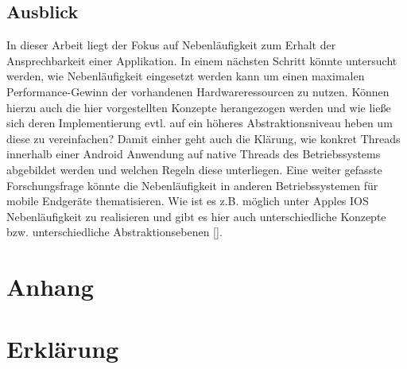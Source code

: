 \documentclass[12pt,oneside,a4paper,bibtotoc,liststotoc]{scrreprt}
\begin{document}
\section{Ausblick}
In dieser Arbeit liegt der Fokus auf Nebenläufigkeit zum Erhalt der Ansprechbarkeit einer Applikation. In einem nächsten Schritt könnte untersucht werden, wie Nebenläufigkeit eingesetzt werden kann um einen maximalen Performance-Gewinn der vorhandenen Hardwareressourcen zu nutzen. Können hierzu auch die hier vorgestellten Konzepte herangezogen werden und wie ließe sich deren Implementierung evtl. auf ein höheres Abstraktionsniveau heben um diese zu vereinfachen? Damit einher geht auch die Klärung, wie konkret Threads innerhalb einer Android Anwendung auf native Threads des Betriebssystems abgebildet werden und welchen Regeln diese unterliegen. Eine weiter gefasste Forschungsfrage könnte die Nebenläufigkeit in anderen Betriebssystemen für mobile Endgeräte thematisieren. Wie ist es z.B. möglich unter Apples IOS Nebenläufigkeit zu realisieren und gibt es hier auch unterschiedliche Konzepte bzw. unterschiedliche Abstraktionsebenen [\citet{javaConInPrac}].

\nocite{javaConInPrac, nebenlaeufigeProg, handlerLooperBlock, android5, philosofen, handlerLooperBlock, androidDevDocu, declarativProgrammingScript, declarativCriticalJurnal, funcProgrJava, rxAllgDoku, heiseReactiveManifesto, reactiveManifesto, androidConcurrencyCriticalCompare, rxJavaCaseStudi, rxJavaTutorial, rxInitiative, futureToObservable, rxOnAndroidTips}
%


%


\appendix

\chapter*{Anhang}
\chapter{Erklärung}
\end{document}
